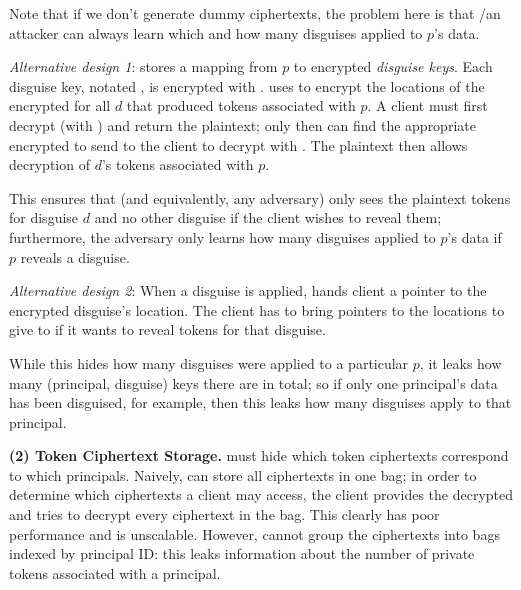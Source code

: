 Note that if we don't generate dummy ciphertexts, the problem here is that \sys/an attacker can always
learn which and how many disguises applied to $p$'s data.

\vspace{12pt}
\emph{Alternative design 1}:
\sys stores a mapping from $p$ to encrypted \emph{disguise keys}. 
%
Each disguise key, notated , is encrypted with . 
\sys uses  to encrypt the locations of the encrypted  for all $d$ that produced
tokens associated with $p$.
A client must first decrypt (with ) and return the  plaintext; only then can \sys find the appropriate
encrypted  to send to the client to decrypt with . The plaintext  then allows decryption of
$d$'s tokens associated with $p$.

This ensures that \sys (and equivalently, any adversary) only sees the plaintext tokens for disguise
$d$ and no other disguise if the client wishes to reveal them; 
furthermore, the adversary only learns how many disguises applied to $p$'s data if $p$ reveals a
disguise.


\vspace{12pt}
\emph{Alternative design 2}: When a disguise is applied, \sys hands client a pointer to the
encrypted disguise's  location. The client has to bring pointers to the locations to give
to \sys if it wants to reveal tokens for that disguise.  

While this hides how many disguises were
applied to a particular $p$, it leaks how many (principal, disguise) keys there are in total; so if
only one principal's data has been disguised, for example, then this leaks how many disguises apply
to that principal.


\vspace{6pt}\noindent\textbf{(2) Token Ciphertext Storage.}
\sys must hide which token ciphertexts correspond to which principals.  Naively, \sys can store
all ciphertexts in one bag; in order to determine which ciphertexts a client may access, the client
provides the decrypted  and \sys tries to decrypt every ciphertext in the bag. This clearly
has poor performance and is unscalable.
However, \sys cannot group the ciphertexts into bags indexed by principal ID: this leaks information
about the number of private tokens associated with a principal.


